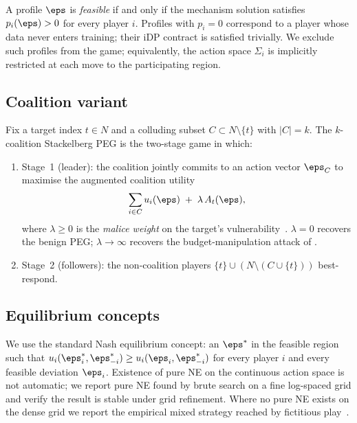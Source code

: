 \begin{assumption}[Participation]
\label{ass:participation}
A profile $\boldsymbol{\eps}$ is \emph{feasible} if and only if the mechanism
solution satisfies $p_i(\boldsymbol{\eps}) > 0$ for every player $i$.
Profiles with $p_i = 0$ correspond to a player whose data never enters
training; their iDP contract is satisfied trivially. We exclude such
profiles from the game; equivalently, the action space $\Sigma_i$ is
implicitly restricted at each move to the participating region.
\end{assumption}

\subsection{Coalition variant}

\begin{definition}
\label{def:coalition}
Fix a target index $t \in N$ and a colluding subset $C \subset
N\setminus\{t\}$ with $|C| = k$. The $k$-coalition Stackelberg PEG is the
two-stage game in which:
\begin{enumerate}
\item Stage~1 (leader): the coalition jointly commits to an action vector
$\boldsymbol{\eps}_C$ to maximise the augmented coalition utility
\begin{equation}
\sum_{i \in C} u_i(\boldsymbol{\eps}) \;+\;
\lambda\, A_t(\boldsymbol{\eps}),
\label{eq:coalition-util}
\end{equation}
where $\lambda \geq 0$ is the \emph{malice weight} on the target's
vulnerability~\cite{pejo2019together}. $\lambda = 0$ recovers the benign
PEG; $\lambda \to \infty$ recovers the
budget-manipulation attack of \citet{kaiser2026your}.
\item Stage~2 (followers): the non-coalition players $\{t\} \cup (N
\setminus (C \cup \{t\}))$ best-respond.
\end{enumerate}
\end{definition}

\subsection{Equilibrium concepts}

We use the standard Nash equilibrium concept: an $\boldsymbol{\eps}^*$ in
the feasible region such that $u_i(\eps_i^*, \boldsymbol{\eps}_{-i}^*) \geq
u_i(\eps_i, \boldsymbol{\eps}_{-i}^*)$ for every player $i$ and every
feasible deviation $\eps_i$. Existence of pure NE on the continuous action
space is not automatic; we report pure NE found by brute search on a fine
log-spaced grid and verify the result is stable under grid refinement.
Where no pure NE exists on the dense grid we report the empirical mixed
strategy reached by fictitious play~\cite{monderer1996potential}.

